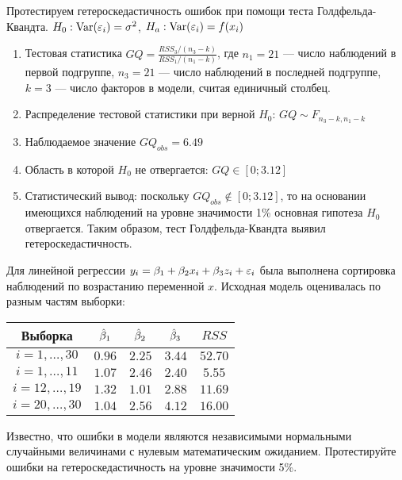 \documentclass[pdftex,11pt,openany]{book}\usepackage[]{graphicx}\usepackage[]{color}
\begin{document}
\begin{solution}
Протестируем гетероскедастичность ошибок при помощи теста Голдфельда-
Квандта. $H_0: \operatorname{Var}(\varepsilon_i)=\sigma^2$, $H_a: \operatorname{Var}(\varepsilon_i)=f(x_i)$

\begin{enumerate}
\item Тестовая статистика $GQ=\frac{RSS_3/(n_3-k)}{RSS_1/(n_1-k)}$, где $n_1=21$ --- число наблюдений в первой подгруппе, $n_3=21$ --- число наблюдений в
последней подгруппе, $k=3$ --- число факторов в модели, считая единичный столбец.
\item Распределение тестовой статистики при верной $H_0$: $GQ\sim F_{n_3-k,n_1-k}$
\item Наблюдаемое значение $GQ_{obs}=6.49$
\item Область в которой $H_0$ не отвергается: $GQ\in [0;3.12]$
\item Статистический вывод: поскольку $GQ_{obs} \notin [0;3.12]$, то на основании имеющихся наблюдений на уровне значимости 1\% основная гипотеза $H_0$ отвергается. Таким образом, тест Голдфельда-Квандта выявил гетероскедастичность.
\end{enumerate} 
\end{solution}


\begin{problem}
Для линейной регрессии $y_i = \beta_1 + \beta_2 x_i + \beta_3 z_i + \varepsilon_i$ была
выполнена сортировка наблюдений по возрастанию переменной $x$. Исходная модель оценивалась по разным частям выборки:

\begin{tabular}{c|cccc}
Выборка & $\hat{\beta}_1$ & $\hat{\beta}_2$ & $\hat{\beta}_3$ & $RSS$ \\
\hline 
$i=1,\ldots, 30$ & $0.96$ & $2.25$ & $3.44$ & $52.70$ \\ 
$i=1,\ldots, 11$ & $1.07$ & $2.46$ & $2.40$ & $5.55$ \\ 
$i=12,\ldots, 19$ & $1.32$ & $1.01$ & $2.88$ & $11.69$ \\ 
$i=20,\ldots, 30$ & $1.04$ & $2.56$ & $4.12$ & $16.00$ \\ 
\end{tabular} 

Известно, что ошибки в модели являются независимыми нормальными случайными величинами с нулевым математическим ожиданием. Протестируйте
ошибки на гетероскедастичность на уровне значимости 5\%.
\end{problem}
\end{document}
